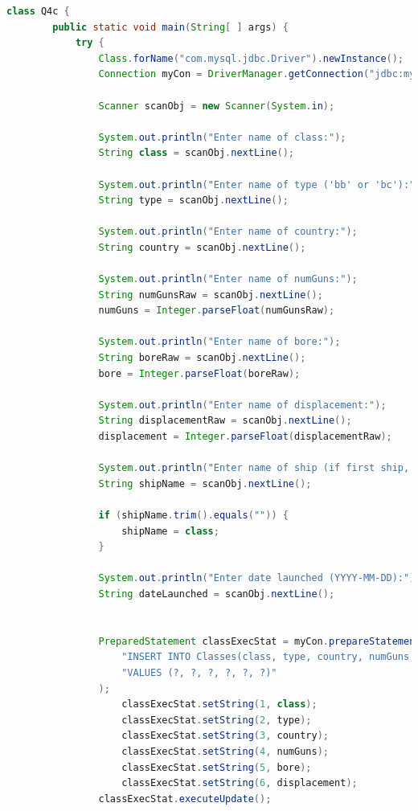 \documentclass[12pt]{article}
\begin{document}
\begin{enumerate}[1.]
\begin{enumerate}[a)]
\begin{lstlisting}[language=JAVA]
    class Q4c {
        public static void main(String[ ] args) {
            try {
                Class.forName("com.mysql.jdbc.Driver").newInstance();
                Connection myCon = DriverManager.getConnection("jdbc:mysql://localhost/Q4");

                Scanner scanObj = new Scanner(System.in);

                System.out.println("Enter name of class:");
                String class = scanObj.nextLine();

                System.out.println("Enter name of type ('bb' or 'bc'):");
                String type = scanObj.nextLine();

                System.out.println("Enter name of country:");
                String country = scanObj.nextLine();

                System.out.println("Enter name of numGuns:");
                String numGunsRaw = scanObj.nextLine();
                numGuns = Integer.parseFloat(numGunsRaw);

                System.out.println("Enter name of bore:");
                String boreRaw = scanObj.nextLine();
                bore = Integer.parseFloat(boreRaw);

                System.out.println("Enter name of displacement:");
                String displacementRaw = scanObj.nextLine();
                displacement = Integer.parseFloat(displacementRaw);

                System.out.println("Enter name of ship (if first ship, skip by pressing ENTER):");
                String shipName = scanObj.nextLine();

                if (shipName.trim().equals("")) {
                    shipName = class;
                }

                System.out.println("Enter date launched (YYYY-MM-DD):");
                String dateLaunched = scanObj.nextLine();


                PreparedStatement classExecStat = myCon.prepareStatement(
                    "INSERT INTO Classes(class, type, country, numGuns, bore, displacement) " +
                    "VALUES (?, ?, ?, ?, ?, ?)"
                );
                    classExecStat.setString(1, class);
                    classExecStat.setString(2, type);
                    classExecStat.setString(3, country);
                    classExecStat.setString(4, numGuns);
                    classExecStat.setString(5, bore);
                    classExecStat.setString(6, displacement);
                classExecStat.executeUpdate();


\end{lstlisting}
\end{enumerate}
\end{enumerate}
\end{document}
